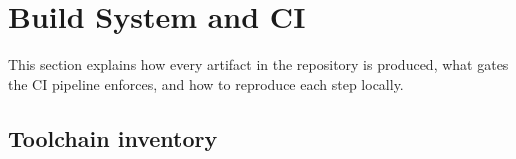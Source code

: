 
\section{Build System and CI}
\label{section:build-and-ci}

This section explains how every artifact in the repository is
produced, what gates the CI pipeline enforces, and how to reproduce
each step locally.

\subsection{Toolchain inventory}

